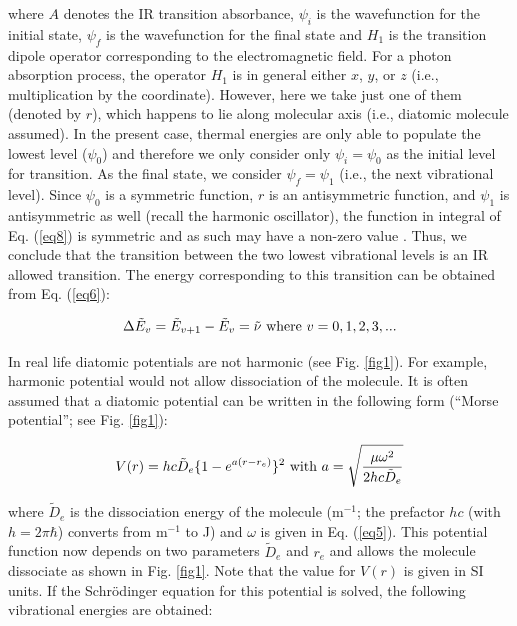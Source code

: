 \documentclass[byrevtex,amssymb,aps,pra,floatfix,letterpaper]{revtex4}
\begin{document}
\noindent
where $A$ denotes the IR transition absorbance, $\psi_i$ is the wavefunction for the initial state, $\psi_f$ is the wavefunction for the final state and $H_1$ is the transition dipole operator corresponding to the electromagnetic field. For a photon absorption process, the operator $H_1$ is in general either $x$, $y$, or $z$ (i.e., multiplication by the coordinate). However, here we take just one of them (denoted by $r$), which happens to lie along molecular axis (i.e., diatomic molecule assumed). In the present case, thermal energies are only able to populate the lowest level ($\psi_0$) and therefore we only consider only $\psi_i = \psi_0$ as the initial level for transition. As the final state, we consider $\psi_f = \psi_1$ (i.e., the next vibrational level). Since $\psi_0$ is a symmetric function, $r$ is an antisymmetric function, and $\psi_1$ is antisymmetric as well (recall the harmonic oscillator), the function in integral of Eq. (\ref{eq8}) is symmetric and as such may have a non-zero value \cite{ATKINS1,HERZBERG1}. Thus, we conclude that the transition between the two lowest vibrational levels is an IR allowed transition. The energy corresponding to this transition can be obtained from Eq. (\ref{eq6}):

\begin{equation}
\Delta \tilde{E}_v = \tilde{E}_{v+1} - \tilde{E}_v = \tilde{\nu}\textnormal{ where }v=0,1,2,3,...
\label{eq9}
\end{equation}

In real life diatomic potentials are not harmonic (see Fig. \ref{fig1}). For example, harmonic potential would not allow dissociation of the molecule. It is often assumed that a diatomic potential can be written in the following form (``Morse potential''; see Fig. \ref{fig1}):

\begin{equation}
V(r) = hc\tilde{D}_e\lbrace1 - e^{a\left(r - r_e\right)}\rbrace^2\textnormal{ with }a = \sqrt{\frac{\mu\omega^2}{2hc\tilde{D}_e}}
\label{eq10}
\end{equation}

\noindent
where $\tilde{D}_e$ is the dissociation energy of the molecule (m$^{-1}$; the prefactor $hc$ (with $h = 2\pi\hbar$) converts from m$^{-1}$ to J) and $\omega$ is given in Eq. (\ref{eq5}). This potential function now depends on two parameters $\tilde{D}_e$ and $r_e$ and allows the molecule dissociate as shown in Fig. \ref{fig1}. Note that the value for $V(r)$ is given in SI units. If the Schr\"odinger equation for this potential is solved, the following vibrational energies are obtained:
\end{document}
